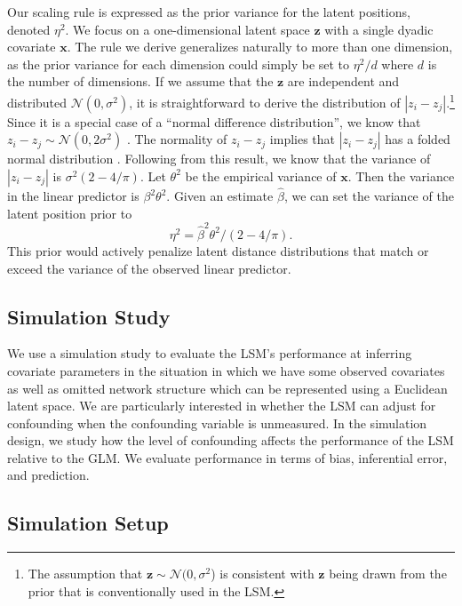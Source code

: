 \documentclass[11pt]{article}
\begin{document}
Our scaling rule is expressed as the prior variance for the latent positions, denoted $\eta^2$. We focus on a one-dimensional latent space $\mathbf{z}$ with a single dyadic covariate $\mathbf{x}$. The rule we derive generalizes naturally to more than one dimension, as the prior variance for each dimension could simply be set to $\eta^2/d$ where $d$ is the number of dimensions.  If we assume that the $\mathbf{z}$ are independent and distributed $\mathcal{N}(0,\sigma^2)$, it is straightforward to derive the distribution of $|z_i - z_j|$.\footnote{The assumption that $\mathbf{z} \sim \mathcal{N}(0,\sigma^2$) is consistent with $\mathbf{z}$ being drawn from the prior that is conventionally used in the LSM.} Since it is a special case of a ``normal difference distribution'', we know that $z_i - z_j \sim \mathcal{N}(0,2\sigma^2)$ \citep{devore2012}. The normality of $z_i - z_j$ implies that $|z_i - z_j|$ has a folded normal distribution \citep{leone1961}. Following from this result, we know that the variance of  $|z_i - z_j|$ is $\sigma^2(2-4/\pi)$.  Let $\theta^2$ be the empirical variance of $\mathbf{x}$. Then the variance in the linear predictor is $\beta^2\theta^2$. Given an estimate $\hat{\beta}$, we can set the variance of the latent position prior to $$\eta^2=\hat{\beta}^2\theta^2/(2-4/\pi).$$  This prior would actively penalize latent distance distributions that match or exceed the variance of the observed linear predictor. 
\subsection{Simulation Study}

We use a simulation study to evaluate the LSM's performance at inferring covariate parameters in the situation in which we have some observed covariates as well as omitted network structure which can be represented using a Euclidean latent space. We are particularly interested in whether the LSM can adjust for confounding when the confounding variable is unmeasured. In the simulation design, we study how the level of confounding affects the performance of the LSM relative to the GLM. We evaluate performance in terms of bias, inferential error, and prediction. 

\subsection{Simulation Setup}
\end{document}
